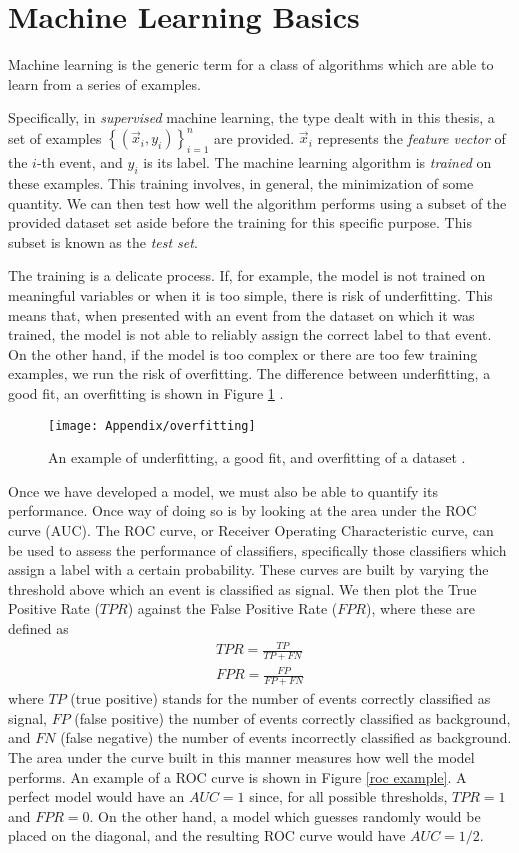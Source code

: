 \documentclass[10pt,a4paper]{book}
\begin{document}
\section{Machine Learning Basics}

Machine learning is the generic term for a class of algorithms which are able to learn from a series of examples. 

Specifically, in \emph{supervised} machine learning, the type dealt with in this thesis, a set of examples $\left\lbrace (\vec{x}_i, y_i)\right\rbrace_{i = 1}^n$ are provided. $\vec{x}_i$ represents the \emph{feature vector} of the $i$-th event, and $y_i$ is its label. The machine learning algorithm is \emph{trained} on these examples. This training involves, in general, the minimization of some quantity. We can then test how well the algorithm performs using a subset of the provided dataset set aside before the training for this specific purpose. This subset is known as the \emph{test set}.

The training is a delicate process. If, for example, the model is not trained on meaningful variables or when it is too simple, there is risk of underfitting. This means that, when presented with an event from the dataset on which it was trained, the model is not able to reliably assign the correct label to that event. On the other hand, if the model is too complex or there are too few training examples, we run the risk of overfitting. The difference between underfitting, a good fit, an overfitting is shown in Figure \ref{overfitting} . 

\begin{figure}
\centering
\texttt{[image: Appendix/overfitting]}
\caption{An example of underfitting, a good fit, and overfitting of a dataset \cite{burkov2019hundred}.}
\label{overfitting}
\end{figure}

Once we have developed a model, we must also be able to quantify its performance. Once way of doing so is by looking at the area under the ROC curve (AUC). The ROC curve, or Receiver Operating Characteristic curve, can be used to assess the performance of classifiers, specifically those classifiers which assign a label with a certain probability. These curves are built by varying the threshold above which an event is classified as signal. We then plot the True Positive Rate ($TPR$) against the False Positive Rate ($FPR$), where these are defined as
\begin{gather}
TPR = \frac{TP}{TP + FN} \\
FPR = \frac{FP}{FP + FN}
\end{gather}
where $TP$ (true positive) stands for the number of events correctly classified as signal, $FP$ (false positive) the number of events correctly classified as background, and $FN$ (false negative) the number of events incorrectly classified as background. The area under the curve built in this manner measures how well the model performs. An example of a ROC curve is shown in Figure \ref{roc example}. A perfect model would have an $AUC = 1$ since, for all possible thresholds, $TPR = 1$ and $FPR = 0$. On the other hand, a model which guesses randomly would be placed on the diagonal, and the resulting ROC curve would have $AUC = 1/2$.
\end{document}
